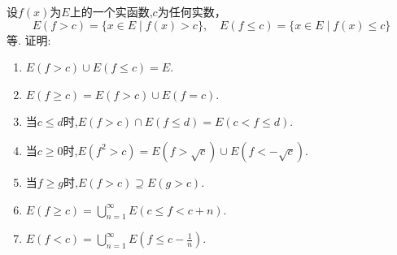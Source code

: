\documentclass[../../main.tex]{subfiles}%
\begin{document}
\begin{proposition}
设$f(x)$为$E$上的一个实函数,$c$为任何实数，
\[
E(f > c) = \{x \in E \mid f(x) > c\}, \quad E(f \leqslant c) = \{x \in E \mid f(x) \leqslant c\}
\]
等. 证明:
\begin{enumerate}[(1)]
\item $E(f > c) \cup E(f \leqslant c) = E$.
\item $E(f \geqslant c) = E(f > c) \cup E(f = c)$.
\item 当$c \leqslant d$时,$E(f > c) \cap E(f \leqslant d) = E(c < f \leqslant d)$.
\item 当$c \geqslant 0$时,$E(f^2 > c) = E(f > \sqrt{c}) \cup E(f < -\sqrt{c})$.
\item 当$f \geqslant g$时,$E(f > c) \supseteq E(g > c)$.
\item $E(f \geqslant c) = \bigcup_{n=1}^{\infty} E(c \leqslant f < c + n)$.
\item $E(f < c) = \bigcup_{n=1}^{\infty} E\left(f \leqslant c - \frac{1}{n}\right)$.
\end{enumerate}
\end{proposition}
\end{document}

